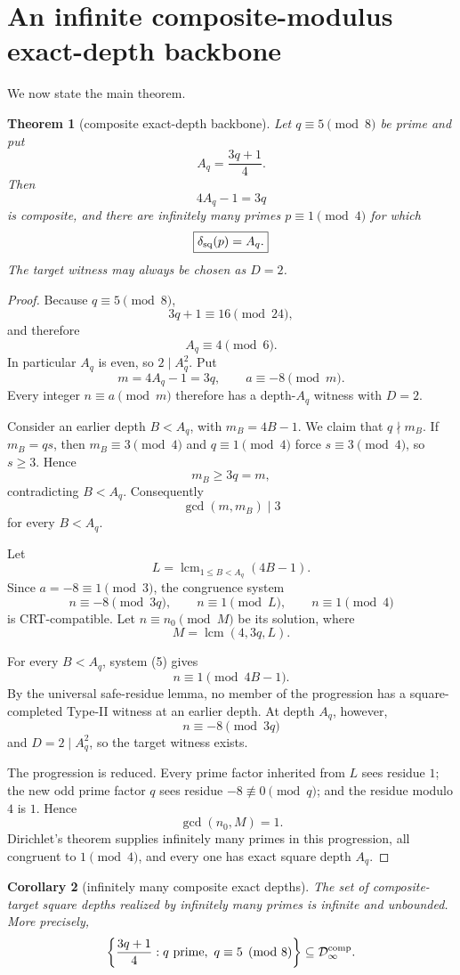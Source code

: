 \documentclass[11pt]{article}
\newtheorem{theorem}{Theorem}
\newtheorem{corollary}[theorem]{Corollary}
\theoremstyle{definition}
\begin{document}
\section{An infinite composite-modulus exact-depth backbone}
We now state the main theorem.

\begin{theorem}[composite exact-depth backbone]\label{thm:backbone}
Let $q\equiv5\pmod8$ be prime and put
\[
A_q=\frac{3q+1}{4}.
\]
Then
\[
4A_q-1=3q
\]
is composite, and there are infinitely many primes $p\equiv1\pmod4$ for which
\[
\boxed{\delta_{\rm sq}(p)=A_q.}
\]
The target witness may always be chosen as $D=2$.
\end{theorem}

\begin{proof}
Because $q\equiv5\pmod8$,
\[
3q+1\equiv16\pmod{24},
\]
and therefore
\[
A_q\equiv4\pmod6.
\]
In particular $A_q$ is even, so $2\mid A_q^2$.  Put
\[
m=4A_q-1=3q,
\qquad
a\equiv-8\pmod m.
\]
Every integer $n\equiv a\pmod m$ therefore has a depth-$A_q$ witness with $D=2$.

Consider an earlier depth $B<A_q$, with $m_B=4B-1$.  We claim that $q\nmid m_B$.  If $m_B=qs$, then $m_B\equiv3\pmod4$ and $q\equiv1\pmod4$ force $s\equiv3\pmod4$, so $s\ge3$.  Hence
\[
m_B\ge3q=m,
\]
contradicting $B<A_q$.  Consequently
\[
\gcd(m,m_B)\mid3
\]
for every $B<A_q$.

Let
\[
L=\operatorname{lcm}_{1\le B<A_q}(4B-1).
\]
Since $a=-8\equiv1\pmod3$, the congruence system
\[
n\equiv-8\pmod{3q},
\qquad
n\equiv1\pmod L,
\qquad
n\equiv1\pmod4 \tag{5}
\]
is CRT-compatible.  Let $n\equiv n_0\pmod M$ be its solution, where
\[
M=\operatorname{lcm}(4,3q,L).
\]

For every $B<A_q$, system (5) gives
\[
n\equiv1\pmod{4B-1}.
\]
By the universal safe-residue lemma, no member of the progression has a square-completed Type-II witness at an earlier depth.  At depth $A_q$, however,
\[
n\equiv-8\pmod{3q}
\]
and $D=2\mid A_q^2$, so the target witness exists.

The progression is reduced.  Every prime factor inherited from $L$ sees residue $1$; the new odd prime factor $q$ sees residue $-8\not\equiv0\pmod q$; and the residue modulo $4$ is $1$.  Hence
\[
\gcd(n_0,M)=1.
\]
Dirichlet's theorem supplies infinitely many primes in this progression, all congruent to $1\pmod4$, and every one has exact square depth $A_q$.
\end{proof}

\begin{corollary}[infinitely many composite exact depths]
The set of composite-target square depths realized by infinitely many primes is infinite and unbounded.  More precisely,
\[
\left\{\frac{3q+1}{4}:q\text{ prime},\ q\equiv5\pmod8\right\}
\subseteq\mathcal D^{\rm comp}_{\infty}.
\]
\end{corollary}
\end{document}
